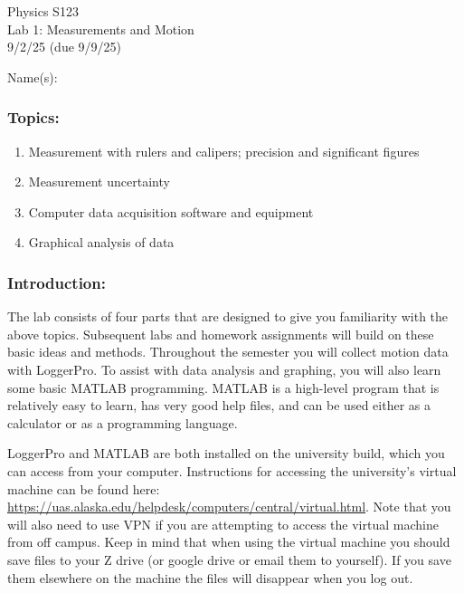 \documentclass[11pt,letterpaper]{article}
\begin{document}
\setlength{\parindent}{0in}

\begin{flushright}
Physics S123\\
Lab 1: Measurements and Motion\\
9/2/25 (due 9/9/25)
\end{flushright}

Name(s):\\


\subsubsection*{Topics:}
\begin{enumerate}
\setlength{\parskip}{3pt}
\item Measurement with rulers and calipers; precision and significant figures
\item Measurement uncertainty
\item Computer data acquisition software and equipment
\item Graphical analysis of data
\end{enumerate}

\subsubsection*{Introduction:}
The lab consists of four parts that are designed to give you familiarity with the above topics. Subsequent labs and homework assignments will build on these basic ideas and methods. Throughout the semester you will collect motion data with LoggerPro. To assist with data analysis and graphing, you will also learn some basic MATLAB programming. MATLAB is a high-level program that is relatively easy to learn, has very good help files, and can be used either as a calculator or as a programming language. 

LoggerPro and MATLAB are both installed on the university build, which you can access from your computer. Instructions for accessing the university's virtual machine can be found here: \url{https://uas.alaska.edu/helpdesk/computers/central/virtual.html}. Note that you will also need to use VPN if you are attempting to access the virtual machine from off campus.
Keep in mind that when using the virtual machine you should save files to your Z drive (or google drive or email them to yourself). If you save them elsewhere on the machine the files will disappear when you log out.
\end{document}

